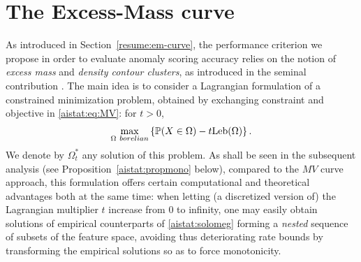 

\section{The Excess-Mass curve}\label{aistat:sec:notations}
As introduced in Section~\ref{resume:em-curve}, the performance criterion we propose in order to evaluate anomaly scoring accuracy relies on 
the notion of \textit{excess mass} and \textit{density contour
clusters}, as introduced in the seminal contribution \cite{Polonik95}. The main idea is to consider a Lagrangian formulation of a constrained minimization problem, obtained by exchanging constraint and objective in \eqref{aistat:eq:MV}: for $t>0$,
\begin{equation}
\label{aistat:solomeg}
\max_{\Omega~ borelian}  \left\{ \mathbb{P}(X \in \Omega) - t \text{Leb}(\Omega) \right\}.
\end{equation}
We denote by $\Omega^*_t$ any solution of this problem. As shall be seen in the subsequent analysis  (see Proposition~\ref{aistat:propmono}
 below), compared to the $MV$ curve approach, this formulation offers certain computational and theoretical advantages both at the same time: when letting (a discretized version of) the Lagrangian multiplier $t$ increase from $0$ to infinity, one may easily obtain solutions of empirical counterparts of \eqref{aistat:solomeg} forming a \textit{nested} sequence of subsets of the feature space, avoiding thus deteriorating rate bounds by transforming the empirical solutions so as to force monotonicity.

